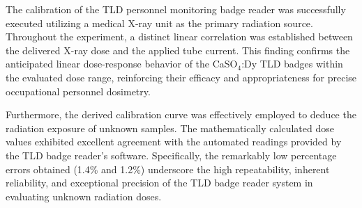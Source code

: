

The calibration of the TLD personnel monitoring badge reader was successfully executed utilizing a medical X-ray unit as the primary radiation source. Throughout the experiment, a distinct linear correlation was established between the delivered X-ray dose and the applied tube current. This finding confirms the anticipated linear dose-response behavior of the CaSO$_4$:Dy TLD badges within the evaluated dose range, reinforcing their efficacy and appropriateness for precise occupational personnel dosimetry.

Furthermore, the derived calibration curve was effectively employed to deduce the radiation exposure of unknown samples. The mathematically calculated dose values exhibited excellent agreement with the automated readings provided by the TLD badge reader's software. Specifically, the remarkably low percentage errors obtained (1.4\% and 1.2\%) underscore the high repeatability, inherent reliability, and exceptional precision of the TLD badge reader system in evaluating unknown radiation doses.
